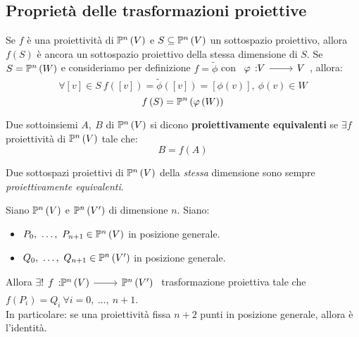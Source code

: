 \subsection{Proprietà delle trasformazioni proiettive}
\begin{observe}
	Se $f$ è una proiettività di $\proj{V}$ e $S\subseteq \proj{V}$ un sottospazio proiettivo, allora $f\left(S\right)$ è ancora un sottospazio proiettivo della stessa dimensione di $S$. Se $S=\proj{W}$ e consideriamo per definizione $f=\widetilde{\phi}$ con $\funz{\phi}{V}{V}$, allora:
	\begin{equation*}
		\forall \left[v\right]\in S\ f\left(\left[v\right]\right)=\widetilde{\phi}\left(\left[v\right]\right)=\left[\phi\left(v\right)\right],\ \phi\left(v\right)\in W
	\end{equation*}
	\begin{equation}
		f\left(S\right)=\proj{\phi\left(W\right)}
	\end{equation}
\vspace{-6mm}
\end{observe}
\begin{define}
	Due sottoinsiemi $A,\ B$ di $\proj{V}$ si dicono \textbf{proiettivamente equivalenti} se $\exists f$ proiettività di $\proj{V}$ tale che:
	\begin{equation}
		B=f\left(A\right)
	\end{equation}
\vspace{-6mm}
\end{define}
\begin{example}
	Due sottospazi proiettivi di $\proj{V}$ della \textit{stessa} dimensione sono sempre \textit{proiettivamente equivalenti}.
\end{example}
\begin{theorema}
	Siano $\proj{V}$ e $\proj{V'}$ di dimensione $n$. Siano:
	\begin{itemize}
		\item $P_0,\ \ldots,\ P_{n+1}\in\proj{V}$ in posizione generale.
		\item $Q_0,\ \ldots,\ Q_{n+1}\in\proj{V'}$ in posizione generale.
	\end{itemize}
Allora $\exists!\funz{f}{\proj{V}}{\proj{V'}}$ trasformazione proiettiva tale che $f\left(P_i\right)=Q_i\ \forall i=0,\ \ldots,\ n+1$.\\
In particolare: se una proiettività fissa $n+2$ punti in posizione generale, allora è l'identità.
\end{theorema}
